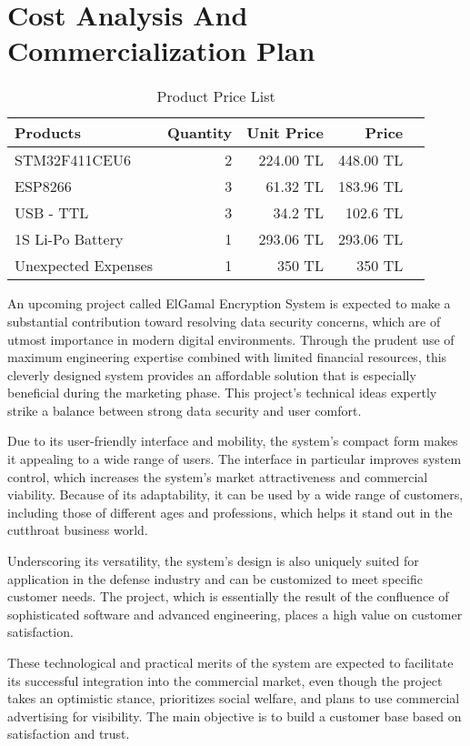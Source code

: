 \documentclass[12pt]{article}
\begin{document}
 	\section{Cost Analysis And Commercialization Plan}
 	\begin{table}[h!]
 		\centering
 		\begin{tabular}{|l|r|r|r|r|}
 			\hline
 			\textbf{Products} & \textbf{Quantity} & \textbf{Unit Price} & \textbf{Price} \\
 			\hline
 			STM32F411CEU6 & 2 & 224.00 TL & 448.00 TL \\ \hline
 			ESP8266       & 3 & 61.32 TL & 183.96 TL \\ \hline
 			USB - TTL     & 3 & 34.2 TL & 102.6 TL \\ \hline 
 			1S Li-Po Battery & 1 & 293.06 TL & 293.06 TL \\ \hline
 			Unexpected Expenses & 1 & 350 TL & 350 TL \\ 
 			\hline
 		\end{tabular}
 		\caption{Product Price List}
 	\end{table}
 	An upcoming project called ElGamal Encryption System is expected to make a substantial contribution toward resolving data security concerns, which are of utmost importance in modern digital environments. Through the prudent use of maximum engineering expertise combined with limited financial resources, this cleverly designed system provides an affordable solution that is especially beneficial during the marketing phase. This project's technical ideas expertly strike a balance between strong data security and user comfort.
 	
 	Due to its user-friendly interface and mobility, the system's compact form makes it appealing to a wide range of users. The interface in particular improves system control, which increases the system's market attractiveness and commercial viability. Because of its adaptability, it can be used by a wide range of customers, including those of different ages and professions, which helps it stand out in the cutthroat business world.
 	
 	Underscoring its versatility, the system's design is also uniquely suited for application in the defense industry and can be customized to meet specific customer needs. The project, which is essentially the result of the confluence of sophisticated software and advanced engineering, places a high value on customer satisfaction.
 	
 	These technological and practical merits of the system are expected to facilitate its successful integration into the commercial market, even though the project takes an optimistic stance, prioritizes social welfare, and plans to use commercial advertising for visibility. The main objective is to build a customer base based on satisfaction and trust.
 	\newpage
\end{document}
